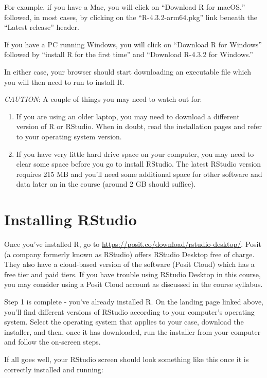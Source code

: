 \documentclass[
]{book}
\begin{document}
For example, if you have a Mac, you will click on ``Download R for macOS,'' followed, in most cases, by clicking on the ``R-4.3.2-arm64.pkg'' link beneath the ``Latest release'' header.

If you have a PC running Windows, you will click on ``Download R for Windows'' followed by ``install R for the first time'' and ``Download R-4.3.2 for Windows.''

In either case, your browser should start downloading an executable file which you will then need to run to install R.

\emph{CAUTION}: A couple of things you may need to watch out for:

\begin{enumerate}
\def\labelenumi{\arabic{enumi}.}
\item
  If you are using an older laptop, you may need to download a different version of R or RStudio. When in doubt, read the installation pages and refer to your operating system version.
\item
  If you have very little hard drive space on your computer, you may need to clear some space before you go to install RStudio. The latest RStudio version requires 215 MB and you'll need some additional space for other software and data later on in the course (around 2 GB should suffice).
\end{enumerate}

\hypertarget{installing-rstudio}{%
\section{Installing RStudio}\label{installing-rstudio}}

Once you've installed R, go to \url{https://posit.co/download/rstudio-desktop/}. Posit (a company formerly known as RStudio) offers RStudio Desktop free of charge. They also have a cloud-based version of the software (Posit Cloud) which has a free tier and paid tiers. If you have trouble using RStudio Desktop in this course, you may consider using a Posit Cloud account as discussed in the course syllabus.

Step 1 is complete - you've already installed R. On the landing page linked above, you'll find different versions of RStudio according to your computer's operating system. Select the operating system that applies to your case, download the installer, and then, once it has downloaded, run the installer from your computer and follow the on-screen steps.

If all goes well, your RStudio screen should look something like this once it is correctly installed and running:
\end{document}
